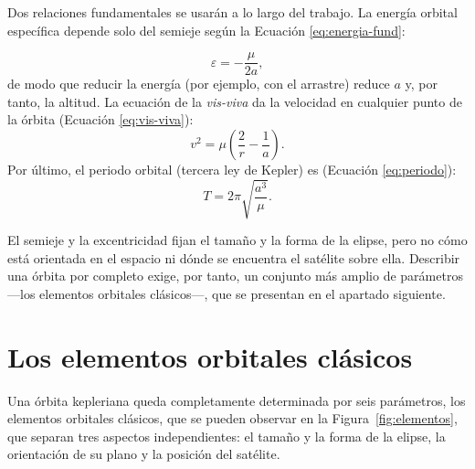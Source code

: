Dos relaciones fundamentales se usarán a lo largo del trabajo. La energía orbital específica depende solo del semieje según la Ecuación \ref{eq:energia-fund}:

\begin{equation}
  \varepsilon = -\frac{\mu}{2a},
  \label{eq:energia-fund}
\end{equation}
de modo que reducir la energía (por ejemplo, con el arrastre) reduce $a$ y, por tanto, la altitud. La ecuación de la \textit{vis-viva} da la velocidad en cualquier punto de la órbita (Ecuación \ref{eq:vis-viva}):
\begin{equation}
  v^{2} = \mu\left(\frac{2}{r} - \frac{1}{a}\right).
  \label{eq:vis-viva}
\end{equation}
Por último, el periodo orbital (tercera ley de Kepler) es (Ecuación \ref{eq:periodo}):
\begin{equation}
  T = 2\pi\sqrt{\frac{a^{3}}{\mu}}.
  \label{eq:periodo}
\end{equation}

El semieje y la excentricidad fijan el tamaño y la forma de la elipse, pero no cómo está orientada en el espacio ni dónde se encuentra el satélite sobre ella. Describir una órbita por completo exige, por tanto, un conjunto más amplio de parámetros ---los elementos orbitales clásicos---, que se presentan en el apartado siguiente.

\section{Los elementos orbitales clásicos}
\label{sec:elementos}

Una órbita kepleriana queda completamente determinada por seis parámetros, los elementos orbitales clásicos, que se pueden observar en la Figura~\ref{fig:elementos}, que separan tres aspectos independientes: el tamaño y la forma de la elipse, la orientación de su plano y la posición del satélite.

